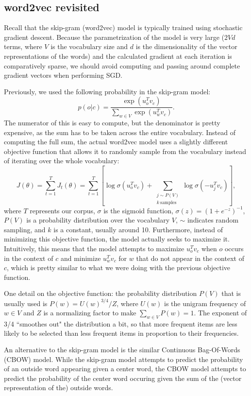 \subsection{word2vec revisited}
Recall that the skip-gram (word2vec) model is typically trained using stochastic gradient descent. Because the parametrization of the model is very large ($2Vd$ terms, where $V$ is the vocabulary size and $d$ is the dimensionality of the vector representations of the words) and the calculated gradient at each iteration is comparatively sparse, we should avoid computing and passing around complete gradient vectors when performing SGD.

Previously, we used the following probability in the skip-gram model:
$$p(o|c) = \frac{\exp\left(u_o^T v_c\right)}{\sum_{w\in V}\exp\left(u_w^T v_c\right)}.$$
The numerator of this is easy to compute, but the denominator is pretty expensive, as the sum has to be taken across the entire vocabulary. Instead of computing the full sum, the actual word2vec model uses a slightly different objective function that allows it to randomly sample from the vocabulary instead of iterating over the whole vocabulary:
$$J(\theta) = \sum_{t=1}^T J_t(\theta) = \sum_{t=1}^T \left[\log \sigma\left(u_o^T v_c\right) + \sum_{\substack{j\sim P(V)\\ k~\text{samples}}} \log \sigma\left(-u_j^T v_c\right)\right],$$
where $T$ represents our corpus, $\sigma$ is the sigmoid function, $\sigma(z) = (1 + e^{-z})^{-1}$, $P(V)$ is a probability distribution over the vocabulary $V$, $\sim$ indicates random sampling, and $k$ is a constant, usually around 10. Furthermore, instead of minimizing this objective function, the model actually seeks to maximize it. Intuitively, this means that the model attempts to maximize $u_o^T v_c$ when $o$ occurs in the context of $c$ and minimize $u_w^T v_c$ for $w$ that do not appear in the context of $c$, which is pretty similar to what we were doing with the previous objective function.

One detail on the objective function: the probability distribution $P(V)$ that is usually used is $P(w) = U(w)^{3/4}/Z$, where $U(w)$ is the unigram frequency of $w \in V$ and $Z$ is a normalizing factor to make $\sum_{w \in V} P(w) = 1$. The exponent of 3/4 ``smoothes out" the distribution a bit, so that more frequent items are less likely to be selected than less frequent items in proportion to their frequencies.

An alternative to the skip-gram model is the similar Continuous Bag-Of-Words (CBOW) model. While the skip-gram model attempts to predict the probability of an outside word appearing given a center word, the CBOW model attempts to predict the probability of the center word occuring given the sum of the (vector representation of the) outside words.

